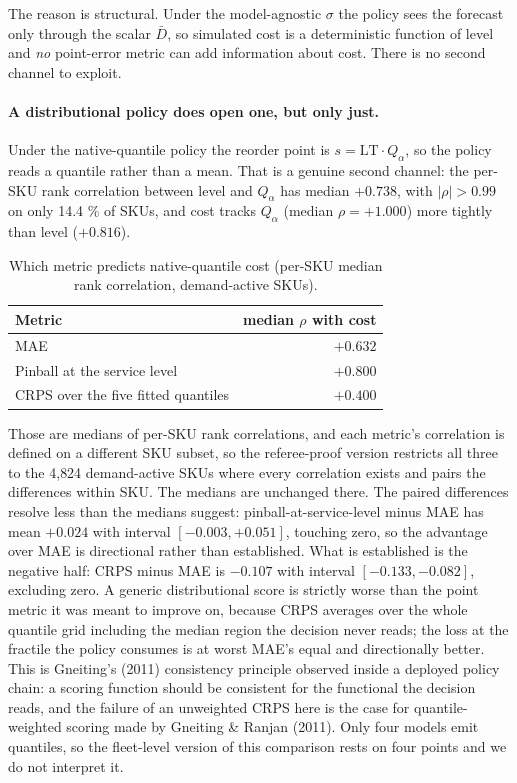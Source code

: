 \documentclass[11pt]{article}
\begin{document}
The reason is structural. Under the model-agnostic $\sigma$ the policy sees the
forecast only through the scalar $\bar{D}$, so simulated cost is a
deterministic function of level and \emph{no} point-error metric can add
information about cost. There is no second channel to exploit.

\paragraph{A distributional policy does open one, but only just.} Under the
native-quantile policy the reorder point is $s = \mathrm{LT}\cdot Q_\alpha$, so
the policy reads a quantile rather than a mean. That is a genuine second
channel: the per-SKU rank correlation between level and $Q_\alpha$ has median
$+0.738$, with $|\rho| > 0.99$ on only 14.4 \% of SKUs, and cost tracks
$Q_\alpha$ (median $\rho = +1.000$) more tightly than level ($+0.816$).

\begin{table}[htbp]
\centering
\caption{Which metric predicts native-quantile cost (per-SKU median rank
correlation, demand-active SKUs).}
\label{tab:metrics}
\begin{tabular}{lr}
\toprule
Metric & median $\rho$ with cost \\
\midrule
MAE                                  & $+0.632$ \\
Pinball at the service level         & $\mathbf{+0.800}$ \\
CRPS over the five fitted quantiles  & $+0.400$ \\
\bottomrule
\end{tabular}
\end{table}

Those are medians of per-SKU rank correlations, and each metric's correlation
is defined on a different SKU subset, so the referee-proof version restricts
all three to the 4{,}824 demand-active SKUs where every correlation exists and
pairs the differences within SKU. The medians are unchanged there. The paired
differences resolve less than the medians suggest: pinball-at-service-level
minus MAE has mean $+0.024$ with interval $[-0.003, +0.051]$, touching zero,
so the advantage over MAE is directional rather than established. What is
established is the negative half: CRPS minus MAE is $-0.107$ with interval
$[-0.133, -0.082]$, excluding zero. A generic distributional score is strictly
worse than the point metric it was meant to improve on, because CRPS averages
over the whole quantile grid including the median region the decision never
reads; the loss at the fractile the policy consumes is at worst MAE's equal
and directionally better. This is Gneiting's (2011) consistency principle observed
inside a deployed policy chain: a scoring function should be consistent for
the functional the decision reads, and the failure of an unweighted CRPS here
is the case for quantile-weighted scoring made by Gneiting \& Ranjan (2011). Only four models emit quantiles, so the fleet-level version of
this comparison rests on four points and we do not interpret it.
\end{document}
